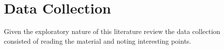 \documentclass[a4paper]{book}
\begin{document}




				\section{Data Collection}
				Given the exploratory nature of this literature review the data collection consisted of reading the material and
				noting interesting points. 
\end{document}
